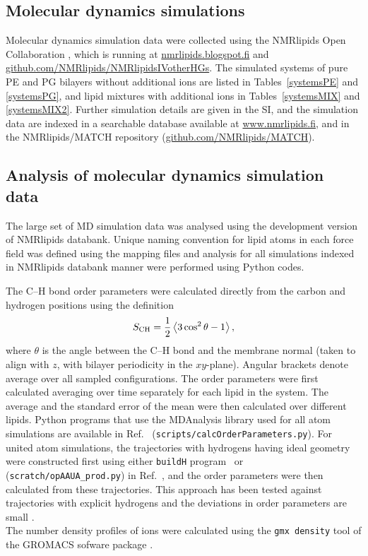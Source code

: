 \documentclass[aps,prl,superscriptaddress,twocolumn]{revtex4}
\begin{document}
\subsection{Molecular dynamics simulations}

Molecular dynamics simulation data were collected using
the NMRlipids Open Collaboration \cite{botan15}, which is running at
\url{nmrlipids.blogspot.fi} and \url{github.com/NMRlipids/NMRlipidsIVotherHGs}.
The simulated systems of pure PE and PG bilayers without additional ions
are listed in Tables~\ref{systemsPE} and \ref{systemsPG},
and lipid mixtures with additional ions in Tables~\ref{systemsMIX} and \ref{systemsMIX2}.
Further simulation details are given in the SI, and
the simulation data are indexed in a
searchable database available at \url{www.nmrlipids.fi},
and in the NMRlipids/MATCH repository (\url{github.com/NMRlipids/MATCH}).

\subsection{Analysis of molecular dynamics simulation data}
The large set of MD simulation data was analysed using the development version of NMRlipids databank.
Unique naming convention for lipid atoms in each force field was defined using the mapping files
and analysis for all simulations indexed in NMRlipids databank manner were performed
using Python codes.

The C--H bond order parameters were calculated directly
from the carbon and hydrogen positions using the definition
\begin{equation}
S_{\rm CH}=\frac{1}{2}\left\langle 3\cos^2\theta -1 \right\rangle,
\end{equation}
where $\theta$ is the angle between the C--H bond and the membrane normal
(taken to align with $z$, with bilayer periodicity in the $xy$-plane).
Angular brackets denote average over all sampled configurations.
The order parameters were first calculated averaging over time separately
for each lipid in the system. The average and
the standard error of the mean were then calculated over different lipids.
Python programs that use the MDAnalysis library \cite{agrawal11,gowers16}
used for all atom simulations are available in Ref.~
(\texttt{scripts/calcOrderParameters.py}). For united atom simulations, the trajectories
with hydrogens having ideal geometry were constructed first using either \texttt{buildH} program~\cite{buildH}
or (\texttt{scratch/opAAUA\_prod.py}) in  Ref.~, and the order parameters were
then calculated from these trajectories. This approach has been tested against trajectories
with explicit hydrogens and the deviations in order parameters are small \cite{buildH,piggot17}.\\
The number density profiles of ions were calculated using the \texttt{gmx density} tool
of the GROMACS sofware package \cite{gromacsMANUAL}.
\end{document}
